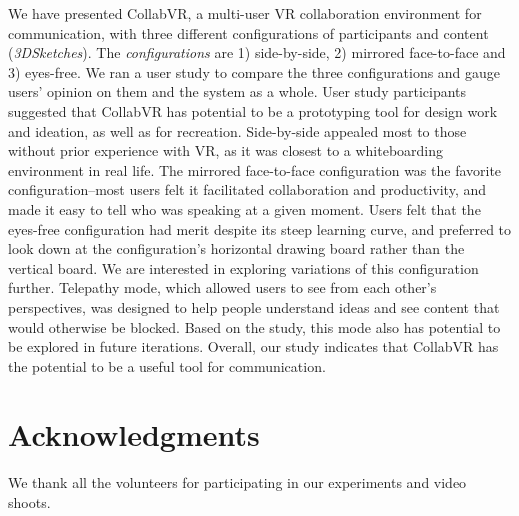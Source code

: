 \documentclass[chi_draft]{sigchi}
\begin{document}
We have presented CollabVR, a multi-user VR collaboration environment for communication, with three different configurations of participants and content (\textit{3DSketches}). The \textit{configurations} are 1) side-by-side, 2) mirrored face-to-face and 3) eyes-free. We ran a user study to compare the three configurations and gauge users' opinion on them and the system as a whole. User study participants suggested that CollabVR has potential to be a prototyping tool for design work and ideation, as well as for recreation. Side-by-side appealed most to those without prior experience with VR, as it was closest to a whiteboarding environment in real life. The mirrored face-to-face configuration was the favorite configuration--most users felt it facilitated collaboration and productivity, and made it easy to tell who was speaking at a given moment. Users felt that the eyes-free configuration had merit despite its steep learning curve, and preferred to look down at the configuration's horizontal drawing board rather than the vertical board. We are interested in exploring variations of this configuration further. Telepathy mode, which allowed users to see from each other's perspectives, was designed to help people understand ideas and see content that would otherwise be blocked. Based on the study, this mode also has potential to be explored in future iterations.
Overall, our study indicates that CollabVR has the potential to be a useful tool for communication.





\section{Acknowledgments}
We thank all the volunteers for participating in our experiments and video shoots.
\end{document}
